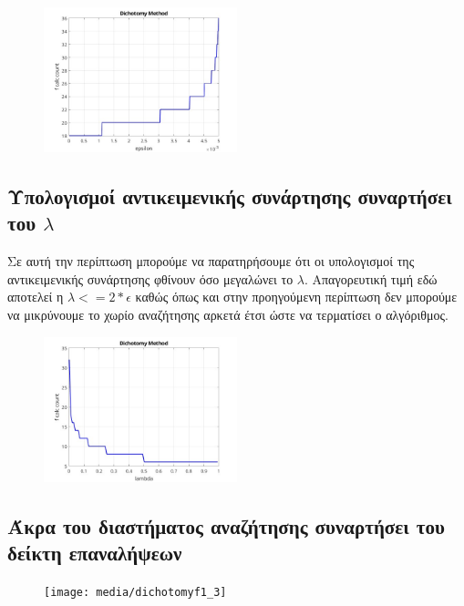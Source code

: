 \begin{figure}[h] %
    \centering
    \includegraphics[width=0.5\textwidth]{media/dichotomyf1_1} %
\end{figure}

\subsection{Υπολογισμοί αντικειμενικής συνάρτησης συναρτήσει του $\lambda$}
Σε αυτή την περίπτωση μπορούμε να παρατηρήσουμε ότι οι υπολογισμοί της αντικειμενικής συνάρτησης
φθίνουν όσο μεγαλώνει το $\lambda$. Απαγορευτική τιμή εδώ αποτελεί η $\lambda <= 2*\epsilon$ καθώς
όπως και στην προηγούμενη περίπτωση δεν μπορούμε να μικρύνουμε το χωρίο αναζήτησης αρκετά έτσι ώστε να 
τερματίσει ο αλγόριθμος.

\begin{figure}[h] %
    \centering
    \includegraphics[width=0.5\textwidth]{media/dichotomyf1_2} %
\end{figure}

\subsection{Άκρα του διαστήματος αναζήτησης συναρτήσει του δείκτη επαναλήψεων}


\begin{figure}[h] %
    \centering
    \texttt{[image: media/dichotomyf1\_3]} %
\end{figure}